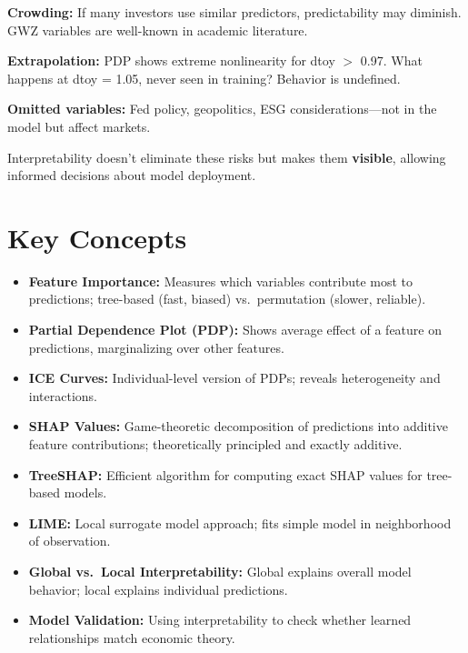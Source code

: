 \documentclass[11pt,a4paper]{article}
\newcommand{\keyword}[1]{\textbf{\textcolor{AccentOrange}{#1}}}
\begin{document}
\textbf{Crowding:} If many investors use similar predictors, predictability may diminish. GWZ variables are well-known in academic literature.

\textbf{Extrapolation:} PDP shows extreme nonlinearity for dtoy $>$ 0.97. What happens at dtoy = 1.05, never seen in training? Behavior is undefined.

\textbf{Omitted variables:} Fed policy, geopolitics, ESG considerations---not in the model but affect markets.

Interpretability doesn't eliminate these risks but makes them \keyword{visible}, allowing informed decisions about model deployment.

\section*{Key Concepts}

\begin{itemize}
    \item \keyword{Feature Importance:} Measures which variables contribute most to predictions; tree-based (fast, biased) vs.\ permutation (slower, reliable).
    
    \item \keyword{Partial Dependence Plot (PDP):} Shows average effect of a feature on predictions, marginalizing over other features.
    
    \item \keyword{ICE Curves:} Individual-level version of PDPs; reveals heterogeneity and interactions.
    
    \item \keyword{SHAP Values:} Game-theoretic decomposition of predictions into additive feature contributions; theoretically principled and exactly additive.
    
    \item \keyword{TreeSHAP:} Efficient algorithm for computing exact SHAP values for tree-based models.
    
    \item \keyword{LIME:} Local surrogate model approach; fits simple model in neighborhood of observation.
    
    \item \keyword{Global vs.\ Local Interpretability:} Global explains overall model behavior; local explains individual predictions.
    
    \item \keyword{Model Validation:} Using interpretability to check whether learned relationships match economic theory.
\end{itemize}
\end{document}
